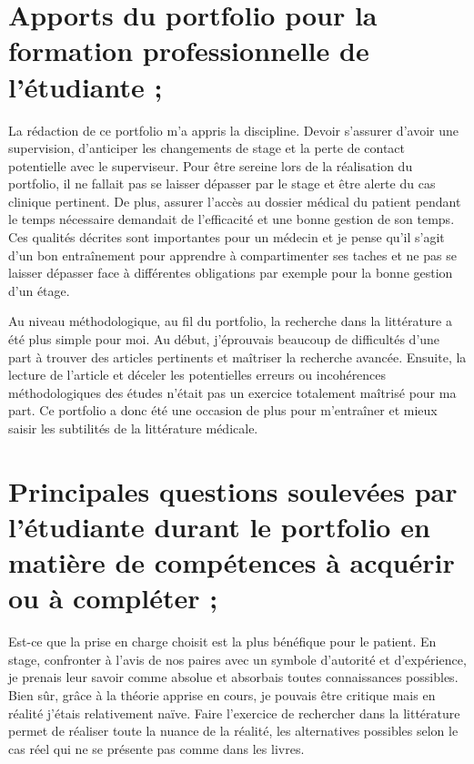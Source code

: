 \section{Apports du portfolio pour la formation professionnelle de l'étudiante ;}
La rédaction de ce portfolio m'a appris la discipline. Devoir s'assurer d'avoir une supervision, d'anticiper les changements de stage et la perte de contact potentielle avec le superviseur. Pour être sereine lors de la réalisation du portfolio, il ne fallait pas se laisser dépasser par le stage et être alerte du cas clinique pertinent. De plus, assurer l'accès au dossier médical du patient pendant le temps nécessaire demandait de l'efficacité et une bonne gestion de son temps. Ces qualités décrites sont importantes pour un médecin et je pense qu'il s'agit d'un bon entraînement pour apprendre à compartimenter ses taches et ne pas se laisser dépasser face à différentes obligations par exemple pour la bonne gestion d'un étage.

Au niveau méthodologique, au fil du portfolio, la recherche dans la littérature a été plus simple pour moi. Au début, j'éprouvais beaucoup de difficultés d'une part à trouver des articles pertinents et maîtriser la recherche avancée. Ensuite, la lecture de l'article et déceler les potentielles erreurs ou incohérences méthodologiques des études n'était pas un exercice totalement maîtrisé pour ma part. Ce portfolio a donc été une occasion de plus pour m'entraîner et mieux saisir les subtilités de la littérature médicale.

\section{Principales questions soulevées par l’étudiante durant le portfolio en matière de compétences à acquérir ou à compléter ;}
Est-ce que la prise en charge choisit est la plus bénéfique pour le patient. En stage, confronter à l'avis de nos paires avec un symbole d'autorité et d'expérience, je prenais leur savoir comme absolue et absorbais toutes connaissances possibles. Bien sûr, grâce à la théorie apprise en cours, je pouvais être critique mais en réalité j'étais relativement naïve. Faire l'exercice de rechercher dans la littérature permet de réaliser toute la nuance de la réalité, les alternatives possibles selon le cas réel qui ne se présente pas comme dans les livres.

